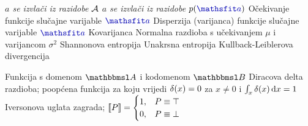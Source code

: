  {\textit{$a$ se izvlači iz razidobe $\mathcal{A}$}}
 {\textit{$a$ se izvlači iz razidobe $p(\rvar a)$}}
 {Očekivanje funkcije slučajne varijable $\rvar a$}
 {Disperzija (varijanca) funkcije slučajne varijable $\rvar a$}
		{Kovarijanca}
 {Normalna razdioba s učekivanjem $\mu$ i varijancom $\sigma^2$}
			{Shannonova entropija}
 {Unakrsna entropija}
		{Kullback-Leiblerova divergencija}

 {Funkcija s domenom $\set A$ i kodomenom $\set B$}
	{Diracova delta razdioba; poopćena funkcija za koju vrijedi $\delta(x)=0$ za $x\neq0$ i $\int_x\dirac(x)\dif x=1$}
 {Iversonova uglata zagrada; $\enbbracket{P}=\begin{cases} 1, & P \equiv \top \\ 0, & P \equiv \bot \end{cases}$}

